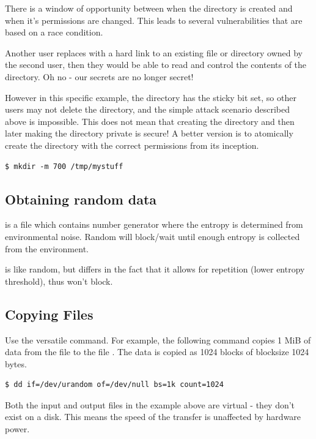 There is a window of opportunity between when the directory is created and when it's permissions are changed.
This leads to several vulnerabilities that are based on a race condition.

Another user replaces  with a hard link to an existing file or directory owned by the second user, then they would be able to read and control the contents of the  directory.
Oh no - our secrets are no longer secret!

However in this specific example, the  directory has the sticky bit set, so other users may not delete the  directory, and the simple attack scenario described above is impossible.
This does not mean that creating the directory and then later making the directory private is secure!
A better version is to atomically create the directory with the correct permissions from its inception.

\begin{verbatim}
$ mkdir -m 700 /tmp/mystuff
\end{verbatim}

\subsection{Obtaining random data}

 is a file which contains number generator where the entropy is determined from environmental noise.
Random will block/wait until enough entropy is collected from the environment.

 is like random, but differs in the fact that it allows for repetition (lower entropy threshold), thus won't block.


\subsection{Copying Files}

Use the versatile  command.
For example, the following command copies 1 MiB of data from the file  to the file .
The data is copied as 1024 blocks of blocksize 1024 bytes.

\begin{verbatim}
$ dd if=/dev/urandom of=/dev/null bs=1k count=1024
\end{verbatim}

Both the input and output files in the example above are virtual - they don't exist on a disk.
This means the speed of the transfer is unaffected by hardware power.

